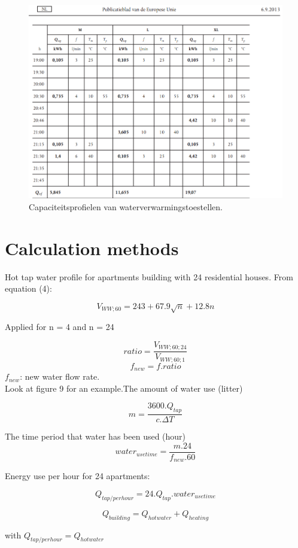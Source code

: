 \documentclass[a4paper,10pt]{article}
\begin{document}
\begin{appendices}
\begin{figure}[H]
\centering
\includegraphics[width=1\columnwidth]{pictures/Profile_M3.png}
\caption[Short title]{Capaciteitsprofielen van waterverwarmingstoestellen.}
\label{fig:ff17}\end{figure}


\section{Calculation methods}

Hot tap water profile for apartments building with 24 residential houses.
From equation (4):

\[V_{WW;60} = 243 + 67.9\sqrt{n} + 12.8n\]

Applied for n = 4 and n = 24

\[ratio =\frac{V_{WW;60;24}}{V_{WW;60;1}}\]
\[f_{new} =f.ratio\]
$f_{new}$: new water flow rate.\\
Look at figure 9 for an example.The amount of water use (litter)

\[m = \frac{3600.Q_{tap}}{c.\Delta T}\]

The time period that water has been used (hour)
\[water_{usetime} = \frac{m.24}{f_{new}.60}\]

Energy use per hour for 24 apartments:

\[Q_{tap/perhour} = 24.Q_{tap}.water_{usetime}\]

\[Q_{building} = Q_{hotwater} + Q_{heating}\]

with $Q_{tap/perhour} = Q_{hotwater}$


  
\end{appendices}
\end{document}

